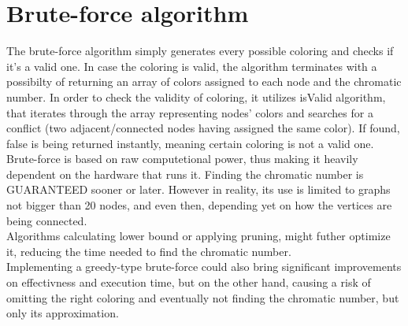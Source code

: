 \documentclass[a4paper]{report}
\begin{document}
		\section{Brute-force algorithm}
		The brute-force algorithm simply generates every possible coloring and checks if it's a valid one. In case the coloring is valid, the algorithm terminates with a possibilty of returning an array of colors assigned to each node and the chromatic number. In order to check the validity of coloring, it utilizes isValid algorithm, that iterates through the array representing nodes' colors and searches for a conflict (two adjacent/connected nodes having assigned the same color). If found, false is being returned instantly, meaning certain coloring is not a valid one.\\
		
		Brute-force is based on raw computetional power, thus making it heavily dependent on the hardware that runs it. Finding the chromatic number is GUARANTEED sooner or later. However in reality, its use is limited to graphs not bigger than 20 nodes, and even then, depending yet on how the vertices are being connected.\\
		
		Algorithms calculating lower bound or applying pruning, might futher optimize it, reducing the time needed to find the chromatic number. \\
		
		Implementing a greedy-type brute-force could also bring significant improvements on effectivness and execution time, but on the other hand, causing a risk of omitting the right coloring and eventually not finding the chromatic number, but only its approximation.	
			
\end{document}
